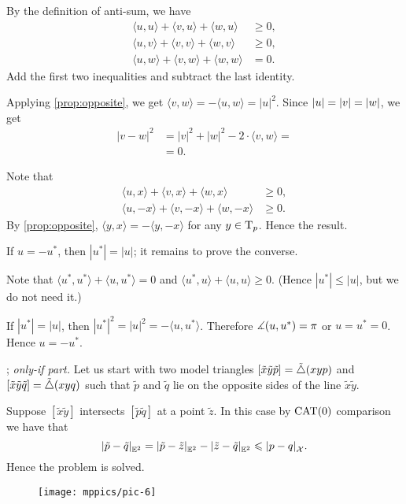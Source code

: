 By the definition of anti-sum, we have
\begin{align*}
\langle u,u\rangle +\langle v,u\rangle +\langle w,u\rangle &\ge 0,
\\
\langle u,v\rangle +\langle v,v\rangle +\langle w,v\rangle &\ge 0,
\\
\langle u,w\rangle +\langle v,w\rangle +\langle w,w\rangle &= 0.
\end{align*}
Add the first two inequalities and subtract the last identity.

Applying \ref{prop:opposite}, we get $\langle v,w\rangle=-\langle u,w\rangle=|u|^2$.
Since $|u|\z=|v|\z=|w|$, we get
\begin{align*}
|v-w|^2&=|v|^2+|w|^2-2\cdot \langle v,w\rangle=
\\
&=0.
\end{align*}


Note that 
\begin{align*}
\langle u,x\rangle +\langle v,x\rangle +\langle w,x\rangle &\ge 0,
\\
\langle u,-x\rangle +\langle v,-x\rangle +\langle w,-x\rangle &\ge 0.
\end{align*}
By \ref{prop:opposite}, $\langle y,x\rangle=-\langle y ,-x\rangle$ for any $y\in \mathrm{T}_p$.
Hence the result.


If $u=-u^*$, then $|u^*|= |u|$; it remains to prove the converse.

Note that $\langle u^*,u^*\rangle +\langle u,u^*\rangle = 0$
and $\langle u^*,u\rangle +\langle u,u\rangle \ge 0$.
(Hence $|u^*|\le |u|$, but we do not need it.)

If $|u^*|= |u|$, then $|u^*|^2=|u|^2=-\langle u,u^*\rangle$.
Therefore $\measuredangle(u,u^*)=\pi$ or $u=u^*=0$.
Hence $u=-u^*$.

\parbf{\ref{ex:sba-2+2-short}}; \textit{only-if part.}
Let us start with two model triangles $[\tilde x\tilde y\tilde p]=\tilde\triangle(xyp)$ and $[\tilde x\tilde y\tilde q]=\tilde\triangle(xyq)$ such that $\tilde p$ and $\tilde q$ lie on the opposite sides of the line $\tilde x\tilde y$.

Suppose $[\tilde x \tilde y]$ intersects $[\tilde p\tilde q]$ at a point $\tilde z$.
In this case by $\mathrm{CAT}(0)$ comparison we have that
\[\dist{\tilde p}{\tilde q}{\EE^2}=\dist{\tilde p}{\tilde z}{\EE^2}-\dist{\tilde z}{\tilde q}{\EE^2}\le \dist{p}{q}{\spc{X}}.\]
Hence the problem is solved.

\begin{wrapfigure}{r}{30mm}
\vskip-2mm
\centering
\texttt{[image: mppics/pic-6]}
\end{wrapfigure}

